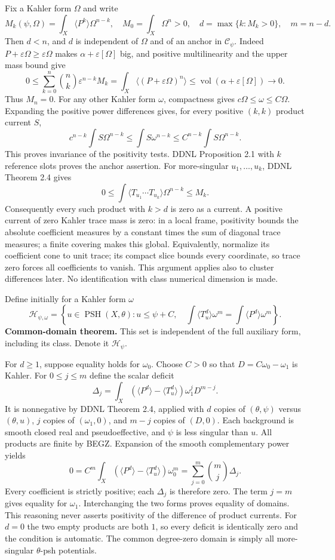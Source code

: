 \documentclass[
  11pt,
]{article}
\begin{document}
Fix a Kahler form \(\Omega\) and write \[
M_k(\psi,\Omega)=\int_X\langle P^k\rangle\Omega^{n-k},\quad M_0=\int_X\Omega^n>0,
\quad d=\max\{k:M_k>0\},\quad m=n-d.
\] Then \(d<n\), and \(d\) is independent of \(\Omega\) and of an anchor
in \(\mathcal{C}_\psi\). Indeed
\(P+\varepsilon\Omega\geq\varepsilon\Omega\) makes
\(\alpha+\varepsilon[\Omega]\) big, and positive multilinearity and the
upper mass bound give \[
0\leq\sum_{k=0}^n\binom nk\varepsilon^{n-k}M_k
=\int_X\langle(P+\varepsilon\Omega)^n\rangle
\leq\operatorname{vol}(\alpha+\varepsilon[\Omega])\longrightarrow0.
\] Thus \(M_n=0\). For any other Kahler form \(\omega\), compactness
gives \(c\Omega\leq\omega\leq C\Omega\). Expanding the positive power
differences gives, for every positive \((k,k)\) product current \(S\),
\[
c^{n-k}\int S\Omega^{n-k}\leq\int S\omega^{n-k}\leq C^{n-k}\int S\Omega^{n-k}.
\] This proves invariance of the positivity tests. DDNL Proposition 2.1
with \(k\) reference slots proves the anchor assertion. For
more-singular \(u_1,\ldots,u_k\), DDNL Theorem 2.4 gives \[
0\leq\int\langle T_{u_1}\cdots T_{u_k}\rangle\Omega^{n-k}\leq M_k.
\] Consequently every such product with \(k>d\) is zero as a current. A
positive current of zero Kahler trace mass is zero: in a local frame,
positivity bounds the absolute coefficient measures by a constant times
the sum of diagonal trace measures; a finite covering makes this global.
Equivalently, normalize its coefficient cone to unit trace; its compact
slice bounds every coordinate, so trace zero forces all coefficients to
vanish. This argument applies also to cluster differences later. No
identification with class numerical dimension is made.

Define initially for a Kahler form \(\omega\) \[
\mathcal{H}_{\psi,\omega}=\left\{u\in\operatorname{PSH}(X,\theta):u\leq\psi+C,
\quad\int\langle T_u^d\rangle\omega^m=\int\langle P^d\rangle\omega^m\right\}.
\] \textbf{Common-domain theorem.} This set is independent of the full
auxiliary form, including its class. Denote it \(\mathcal{H}_\psi\).

For \(d\geq1\), suppose equality holds for \(\omega_0\). Choose \(C>0\)
so that \(D=C\omega_0-\omega_1\) is Kahler. For \(0\leq j\leq m\) define
the scalar deficit \[
\Delta_j=\int_X(\langle P^d\rangle-\langle T_u^d\rangle)\omega_1^jD^{m-j}.
\] It is nonnegative by DDNL Theorem 2.4, applied with \(d\) copies of
\((\theta,\psi)\) versus \((\theta,u)\), \(j\) copies of
\((\omega_1,0)\), and \(m-j\) copies of \((D,0)\). Each background is
smooth closed real and pseudoeffective, and \(\psi\) is less singular
than \(u\). All products are finite by BEGZ. Expansion of the smooth
complementary power yields \[
0=C^m\int_X(\langle P^d\rangle-\langle T_u^d\rangle)\omega_0^m
=\sum_{j=0}^m\binom mj\Delta_j.
\] Every coefficient is strictly positive; each \(\Delta_j\) is
therefore zero. The term \(j=m\) gives equality for \(\omega_1\).
Interchanging the two forms proves equality of domains. This reasoning
never asserts positivity of the difference of product currents. For
\(d=0\) the two empty products are both \(1\), so every deficit is
identically zero and the condition is automatic. The common degree-zero
domain is simply all more-singular \(\theta\)-psh potentials.
\end{document}
